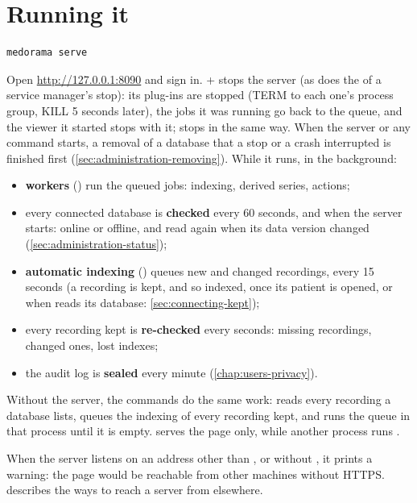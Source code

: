 \section{Running it}
\label{sec:administration-running}

\begin{lstlisting}[style=shell]
medorama serve
\end{lstlisting}
Open \url{http://127.0.0.1:8090} and sign in. + stops the server (as does the
 of a service manager's stop): its plug-ins are stopped (TERM to each one's process
group, KILL 5 seconds later), the jobs it was running go back to the queue, and the viewer it
started stops with it;  stops in the same way. When the server or any command
starts, a removal of a database that a stop or a crash interrupted is finished first
(\cref{sec:administration-removing}). While it runs, in the background:
\begin{itemize}
\item \textbf{workers} () run the queued jobs: indexing, derived series, actions;
\item every connected database is \textbf{checked} every 60 seconds, and when the server starts:
  online or offline, and read again when its data version changed
  (\cref{sec:administration-status});
\item \textbf{automatic indexing} () queues new and changed recordings, every
  15 seconds (a recording is kept, and so indexed, once its patient is opened, or when
   reads its database: \cref{sec:connecting-kept});
\item every recording kept is \textbf{re-checked} every  seconds:
  missing recordings, changed ones, lost indexes;
\item the audit log is \textbf{sealed} every minute (\cref{chap:users-privacy}).
\end{itemize}
Without the server, the commands do the same work:  reads
every recording a database lists,  queues the indexing of every
recording kept, and  runs the queue in that process until it is
empty.  serves the page only, while another process runs
.

When the server listens on an address other than ,  or
 without , it prints a warning: the page would be reachable
from other machines without HTTPS.  describes the ways to reach a server
from elsewhere.

